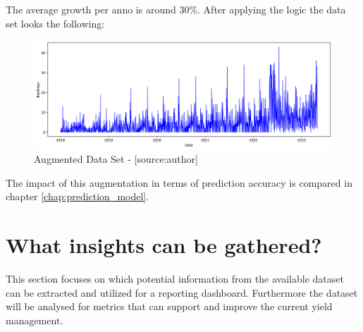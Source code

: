 The average growth per anno is around 30\%. After applying the logic the data set looks the following:  
\begin{figure}[H]
	\centering
		\includegraphics[width=14cm]{images/with_augmentation}
	\caption{Augmented Data Set - [source:author]}
	\label{fig:noAug}
\end{figure}
The impact of this augmentation in terms of prediction accuracy is compared in chapter \ref{chap:prediction_model}.

\section{What insights can be gathered?}
This section focuses on which potential information from the available dataset can be extracted and utilized for a reporting dashboard. Furthermore the dataset will be analysed for metrics that can support and improve the current yield management. 


